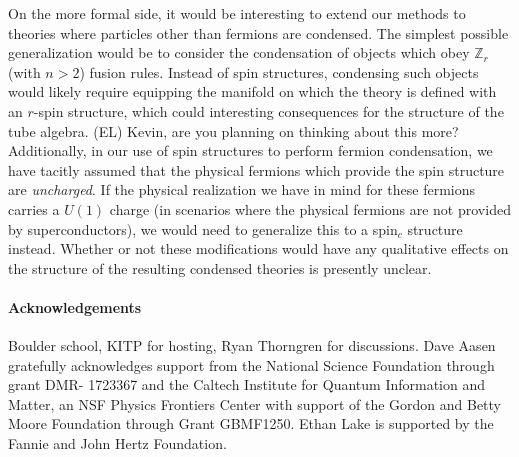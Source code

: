 \documentclass[12pt,a4paper]{article}
\newcommand{\zz}{\mathbb{Z}}
\newcommand{\mcc}{\mathcal{C}}
\newcommand{\ethan}[1]{{\color{amethyst}\footnotesize{(EL) #1}}}
\begin{document}

On the more formal side, it would be interesting to extend our methods to theories where particles other than fermions are condensed. 
The simplest possible generalization would be to consider the condensation of objects which obey $\zz_r$ (with $n>2$) fusion rules. 
Instead of spin structures, condensing such objects would likely require equipping the manifold on which the theory is defined with an $r$-spin structure, which could interesting consequences for the structure of the 
tube algebra. \ethan{Kevin, are you planning on thinking about this more?} 
Additionally, in our use of spin structures %
to perform fermion condensation, we have tacitly assumed that the physical fermions which provide the spin structure are {\it uncharged}. 
If the physical realization we have in mind for these fermions carries a $U(1)$ charge (in scenarios where 
the physical fermions are not provided by superconductors), we would need to generalize this to a spin$_c$ structure instead. 
Whether or not these modifications would have any qualitative effects on the structure of the resulting condensed theories 
is presently unclear.  


 
 \paragraph{Acknowledgements}
 Boulder school, KITP for hosting, Ryan Thorngren for discussions. 
Dave Aasen gratefully acknowledges support from the National Science Foundation through grant DMR- 1723367
and the Caltech Institute for Quantum Information and Matter, 
an NSF Physics Frontiers Center with support of the Gordon and Betty Moore Foundation through Grant GBMF1250.
Ethan Lake is supported by the Fannie and John Hertz Foundation.

 
 

{}
\end{document}
